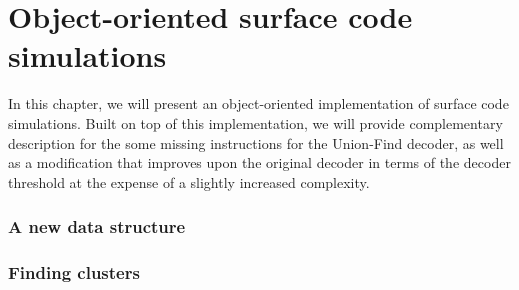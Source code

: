 \chapter{Object-oriented surface code simulations}
In this chapter, we will present an object-oriented implementation of surface code simulations. Built on top of this implementation, we will provide complementary description for the some missing instructions for the Union-Find decoder, as well as a modification that improves upon the original decoder in terms of the decoder threshold at the expense of a slightly increased complexity. 

\subsection{A new data structure}

\subsection{Finding clusters}